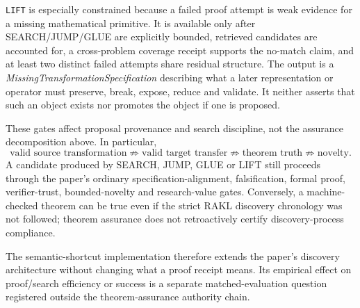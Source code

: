 \texttt{LIFT} is especially constrained because a failed proof attempt is weak evidence for a missing mathematical primitive. It is available only after SEARCH/JUMP/GLUE are explicitly bounded, retrieved candidates are accounted for, a cross-problem coverage receipt supports the no-match claim, and at least two distinct failed attempts share residual structure. The output is a \emph{MissingTransformationSpecification} describing what a later representation or operator must preserve, break, expose, reduce and validate. It neither asserts that such an object exists nor promotes the object if one is proposed.

These gates affect proposal provenance and search discipline, not the assurance decomposition above. In particular,
\[
\text{valid source transformation}
\not\Rightarrow
\text{valid target transfer}
\not\Rightarrow
\text{theorem truth}
\not\Rightarrow
\text{novelty}.
\]
A candidate produced by SEARCH, JUMP, GLUE or LIFT still proceeds through the paper's ordinary specification-alignment, falsification, formal proof, verifier-trust, bounded-novelty and research-value gates. Conversely, a machine-checked theorem can be true even if the strict RAKL discovery chronology was not followed; theorem assurance does not retroactively certify discovery-process compliance.

The semantic-shortcut implementation therefore extends the paper's discovery architecture without changing what a proof receipt means. Its empirical effect on proof/search efficiency or success is a separate matched-evaluation question registered outside the theorem-assurance authority chain.
